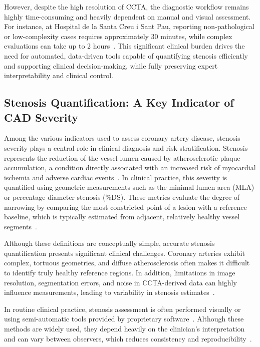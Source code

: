 However, despite the high resolution of CCTA, the diagnostic workflow remains highly time-consuming and heavily dependent on manual and visual assessment. For instance, at Hospital de la Santa Creu i Sant Pau, reporting non-pathological or low-complexity cases requires approximately 30 minutes, while complex evaluations can take up to 2 hours~\cite{acebes2024}. This significant clinical burden drives the need for automated, data-driven tools capable of quantifying stenosis efficiently and supporting clinical decision-making, while fully preserving expert interpretability and clinical control.

\subsection{Stenosis Quantification: A Key Indicator of CAD Severity}
\label{subsec:stenosis-quantification}

Among the various indicators used to assess coronary artery disease, stenosis severity plays a central role in clinical diagnosis and risk stratification. Stenosis represents the reduction of the vessel lumen caused by atherosclerotic plaque accumulation, a condition directly associated with an increased risk of myocardial ischemia and adverse cardiac events~\cite{knuuti2020,garcia2014}. In clinical practice, this severity is quantified using geometric measurements such as the minimal lumen area (MLA) or percentage diameter stenosis (\%DS). These metrics evaluate the degree of narrowing by comparing the most constricted point of a lesion with a reference baseline, which is typically estimated from adjacent, relatively healthy vessel segments~\cite{garcia2014,hideo_kajita2019}.

Although these definitions are conceptually simple, accurate stenosis quantification presents significant clinical challenges. Coronary arteries exhibit complex, tortuous geometries, and diffuse atherosclerosis often makes it difficult to identify truly healthy reference regions. In addition, limitations in image resolution, segmentation errors, and noise in CCTA-derived data can highly influence measurements, leading to variability in stenosis estimates~\cite{kalisz2016,hideo_kajita2019}.

In routine clinical practice, stenosis assessment is often performed visually or using semi-automatic tools provided by proprietary software~\cite{acebes2024,cury2022}. Although these methods are widely used, they depend heavily on the clinician's interpretation and can vary between observers, which reduces consistency and reproducibility~\cite{hideo_kajita2019}.

